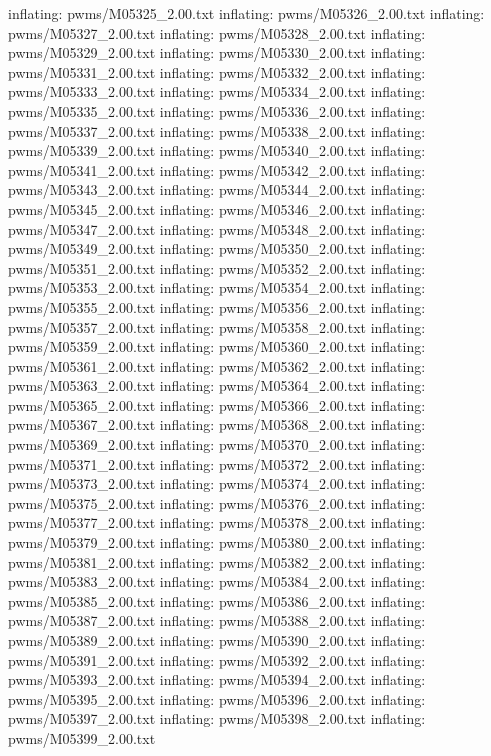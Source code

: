 \documentclass[letterpaper,10pt,english]{sphinxmanual}
\begin{document}
{\begin{sphinxVerbatim}[commandchars=\\\{\}]
  inflating: pwms/M05325\_2.00.txt
  inflating: pwms/M05326\_2.00.txt
  inflating: pwms/M05327\_2.00.txt
  inflating: pwms/M05328\_2.00.txt
  inflating: pwms/M05329\_2.00.txt
  inflating: pwms/M05330\_2.00.txt
  inflating: pwms/M05331\_2.00.txt
  inflating: pwms/M05332\_2.00.txt
  inflating: pwms/M05333\_2.00.txt
  inflating: pwms/M05334\_2.00.txt
  inflating: pwms/M05335\_2.00.txt
  inflating: pwms/M05336\_2.00.txt
  inflating: pwms/M05337\_2.00.txt
  inflating: pwms/M05338\_2.00.txt
  inflating: pwms/M05339\_2.00.txt
  inflating: pwms/M05340\_2.00.txt
  inflating: pwms/M05341\_2.00.txt
  inflating: pwms/M05342\_2.00.txt
  inflating: pwms/M05343\_2.00.txt
  inflating: pwms/M05344\_2.00.txt
  inflating: pwms/M05345\_2.00.txt
  inflating: pwms/M05346\_2.00.txt
  inflating: pwms/M05347\_2.00.txt
  inflating: pwms/M05348\_2.00.txt
  inflating: pwms/M05349\_2.00.txt
  inflating: pwms/M05350\_2.00.txt
  inflating: pwms/M05351\_2.00.txt
  inflating: pwms/M05352\_2.00.txt
  inflating: pwms/M05353\_2.00.txt
  inflating: pwms/M05354\_2.00.txt
  inflating: pwms/M05355\_2.00.txt
  inflating: pwms/M05356\_2.00.txt
  inflating: pwms/M05357\_2.00.txt
  inflating: pwms/M05358\_2.00.txt
  inflating: pwms/M05359\_2.00.txt
  inflating: pwms/M05360\_2.00.txt
  inflating: pwms/M05361\_2.00.txt
  inflating: pwms/M05362\_2.00.txt
  inflating: pwms/M05363\_2.00.txt
  inflating: pwms/M05364\_2.00.txt
  inflating: pwms/M05365\_2.00.txt
  inflating: pwms/M05366\_2.00.txt
  inflating: pwms/M05367\_2.00.txt
  inflating: pwms/M05368\_2.00.txt
  inflating: pwms/M05369\_2.00.txt
  inflating: pwms/M05370\_2.00.txt
  inflating: pwms/M05371\_2.00.txt
  inflating: pwms/M05372\_2.00.txt
  inflating: pwms/M05373\_2.00.txt
  inflating: pwms/M05374\_2.00.txt
  inflating: pwms/M05375\_2.00.txt
  inflating: pwms/M05376\_2.00.txt
  inflating: pwms/M05377\_2.00.txt
  inflating: pwms/M05378\_2.00.txt
  inflating: pwms/M05379\_2.00.txt
  inflating: pwms/M05380\_2.00.txt
  inflating: pwms/M05381\_2.00.txt
  inflating: pwms/M05382\_2.00.txt
  inflating: pwms/M05383\_2.00.txt
  inflating: pwms/M05384\_2.00.txt
  inflating: pwms/M05385\_2.00.txt
  inflating: pwms/M05386\_2.00.txt
  inflating: pwms/M05387\_2.00.txt
  inflating: pwms/M05388\_2.00.txt
  inflating: pwms/M05389\_2.00.txt
  inflating: pwms/M05390\_2.00.txt
  inflating: pwms/M05391\_2.00.txt
  inflating: pwms/M05392\_2.00.txt
  inflating: pwms/M05393\_2.00.txt
  inflating: pwms/M05394\_2.00.txt
  inflating: pwms/M05395\_2.00.txt
  inflating: pwms/M05396\_2.00.txt
  inflating: pwms/M05397\_2.00.txt
  inflating: pwms/M05398\_2.00.txt
  inflating: pwms/M05399\_2.00.txt

\end{sphinxVerbatim}}
\end{document}
